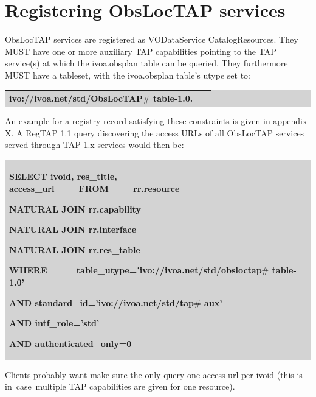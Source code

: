 \documentclass[11pt,a4paper]{ivoa}
\begin{document}
\section{Registering ObsLocTAP services}

ObsLocTAP services are registered as VODataService CatalogResources. They MUST have 
one or more auxiliary TAP capabilities pointing to the TAP service(s) at which the 
ivoa.obsplan table can be queried. They furthermore MUST have a tableset, with the 
ivoa.obsplan table's utype set to:


\bigskip
\par
\begingroup\setlength{\fboxsep}{0pt}
\colorbox{lightgray}{%
\begin{tabular}{|p{5.53in}|}
\hline
ivo://ivoa.net/std/ObsLocTAP$\#$ table-1.0.\ \ \   \\
\hline
\end{tabular}%
}\endgroup
\par
\bigskip


An example for a registry record satisfying these constraints is given in appendix X. 
A RegTAP 1.1 query discovering the access URLs of all ObsLocTAP services served through 
TAP 1.x services would then be:      

\bigskip
\par
\begingroup\setlength{\fboxsep}{0pt}
\colorbox{lightgray}{%
\begin{tabular}{|p{5.53in}|}
\hline
SELECT ivoid, res\_title, access\_url\ \ \ \ \ FROM\ \ \ \ \   rr.resource\ \ \ \ \ \   \par NATURAL JOIN rr.capability\ \ \ \ \ \   \par NATURAL JOIN rr.interface\ \ \ \ \ \   \par NATURAL JOIN rr.res\_table\ \ \ \   \par WHERE\ \ \ \ \ \  table\_utype='ivo://ivoa.net/std/obsloctap$\#$ table-1.0'\ \ \ \ \ \   \par AND standard\_id='ivo://ivoa.net/std/tap$\#$ aux'\ \ \ \ \ \   \par AND intf\_role='std'\ \ \ \ \   \par AND authenticated\_only=0\ \  \\
\hline
\end{tabular}%
}\endgroup
\par
\bigskip
Clients probably want make sure the only query one access url per ivoid (this is in\ 
case\ multiple TAP capabilities are given for one   resource).
\par


\end{document}

